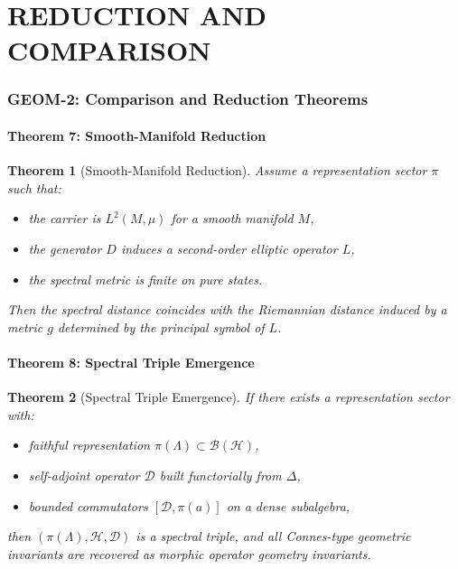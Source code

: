 \documentclass[12pt, oneside]{article}
\newtheorem{theorem}{Theorem}[section]
\begin{document}
\part{REDUCTION AND COMPARISON}

\section{GEOM-2: Comparison and Reduction Theorems}

\subsection{Theorem 7: Smooth-Manifold Reduction}

\begin{theorem}[Smooth-Manifold Reduction]
Assume a representation sector $\pi$ such that:
\begin{itemize}
    \item the carrier is $L^2(M,\mu)$ for a smooth manifold $M$,
    \item the generator $D$ induces a second-order elliptic operator $L$,
    \item the spectral metric is finite on pure states.
\end{itemize}
Then the spectral distance coincides with the Riemannian distance induced by a metric $g$ determined by the principal symbol of $L$.
\end{theorem}

\subsection{Theorem 8: Spectral Triple Emergence}

\begin{theorem}[Spectral Triple Emergence]
If there exists a representation sector with:
\begin{itemize}
    \item faithful representation $\pi(\Lambda) \subset \mathcal{B}(\mathcal{H})$,
    \item self-adjoint operator $\mathcal{D}$ built functorially from $\Delta$,
    \item bounded commutators $[\mathcal{D}, \pi(a)]$ on a dense subalgebra,
\end{itemize}
then $(\pi(\Lambda), \mathcal{H}, \mathcal{D})$ is a spectral triple, and all Connes-type geometric invariants are recovered as morphic operator geometry invariants.
\end{theorem}
\end{document}

